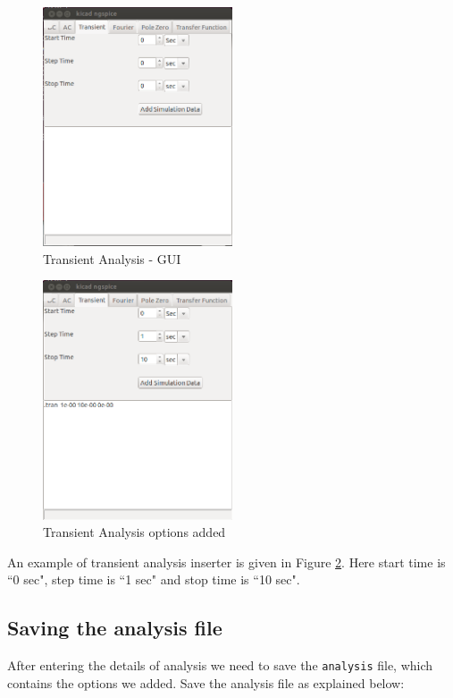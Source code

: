 \begin{figure}[t]
\centering
\includegraphics[width=0.5\textwidth]{figures/6}
\caption{Transient Analysis - GUI}
\label{6}
\end{figure}
 \begin{figure}[t]
\centering
\includegraphics[width=0.5\textwidth]{figures/7}
\caption{Transient Analysis options added}
\label{7}
\end{figure}
An example of transient analysis inserter is given in Figure \ref{7}.
Here start time is ``0 sec", step time is ``1 sec" and stop time is ``10 sec".

\subsection{Saving the analysis file}
After entering the details of analysis we need to save the {\tt analysis} file, which contains the options we added. Save the analysis file as explained below:

